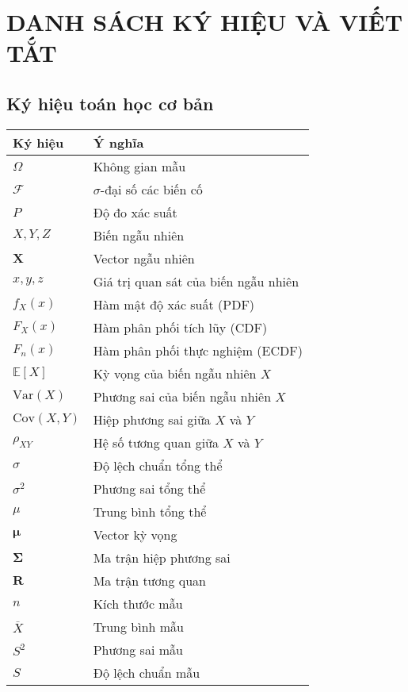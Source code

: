 \chapter*{DANH SÁCH KÝ HIỆU VÀ VIẾT TẮT}

\section*{Ký hiệu toán học cơ bản}
\begin{longtable}{@{}p{3cm}p{10cm}@{}}
\textbf{Ký hiệu} & \textbf{Ý nghĩa} \\
\hline
\endhead
$\Omega$ & Không gian mẫu \\
$\mathcal{F}$ & $\sigma$-đại số các biến cố \\
$P$ & Độ đo xác suất \\
$X, Y, Z$ & Biến ngẫu nhiên \\
$\mathbf{X}$ & Vector ngẫu nhiên \\
$x, y, z$ & Giá trị quan sát của biến ngẫu nhiên \\
$f_X(x)$ & Hàm mật độ xác suất (PDF) \\
$F_X(x)$ & Hàm phân phối tích lũy (CDF) \\
$F_n(x)$ & Hàm phân phối thực nghiệm (ECDF) \\
$\mathbb{E}[X]$ & Kỳ vọng của biến ngẫu nhiên $X$ \\
$\text{Var}(X)$ & Phương sai của biến ngẫu nhiên $X$ \\
$\text{Cov}(X,Y)$ & Hiệp phương sai giữa $X$ và $Y$ \\
$\rho_{XY}$ & Hệ số tương quan giữa $X$ và $Y$ \\
$\sigma$ & Độ lệch chuẩn tổng thể \\
$\sigma^2$ & Phương sai tổng thể \\
$\mu$ & Trung bình tổng thể \\
$\boldsymbol{\mu}$ & Vector kỳ vọng \\
$\boldsymbol{\Sigma}$ & Ma trận hiệp phương sai \\
$\mathbf{R}$ & Ma trận tương quan \\
$n$ & Kích thước mẫu \\
$\overline{X}$ & Trung bình mẫu \\
$S^2$ & Phương sai mẫu \\
$S$ & Độ lệch chuẩn mẫu \\
\end{longtable}

